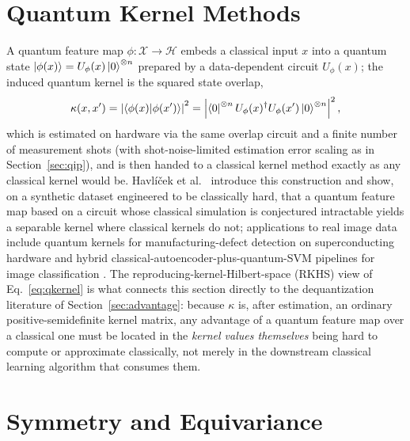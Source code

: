\documentclass[11pt]{article}
\begin{document}
\section{Quantum Kernel Methods}
\label{sec:kernel}
A quantum feature map $\phi:\mathcal{X}\to\mathcal{H}$ embeds a classical input $x$ into a quantum state $\ket{\phi(x)} = U_\phi(x)\ket{0}^{\otimes n}$ prepared by a data-dependent circuit $U_\phi(x)$; the induced quantum kernel is the squared state overlap,
\begin{equation}
\kappa(x,x') = \left|\braket{\phi(x)}{\phi(x')}\right|^2 = \left|\bra{0}^{\otimes n} U_\phi(x)^\dagger U_\phi(x') \ket{0}^{\otimes n}\right|^2,
\label{eq:qkernel}
\end{equation}
which is estimated on hardware via the same overlap circuit and a finite number of measurement shots (with shot-noise-limited estimation error scaling as in Section~\ref{sec:qip}), and is then handed to a classical kernel method exactly as any classical kernel would be. Havlíček et al.\ \cite{Havlicek2019} introduce this construction and show, on a synthetic dataset engineered to be classically hard, that a quantum feature map based on a circuit whose classical simulation is conjectured intractable yields a separable kernel where classical kernels do not; applications to real image data include quantum kernels for manufacturing-defect detection on superconducting hardware \cite{QuantumKernelDefect2022} and hybrid classical-autoencoder-plus-quantum-SVM pipelines for image classification \cite{Slabbert2024}. The reproducing-kernel-Hilbert-space (RKHS) view of Eq.~\eqref{eq:qkernel} is what connects this section directly to the dequantization literature of Section~\ref{sec:advantage}: because $\kappa$ is, after estimation, an ordinary positive-semidefinite kernel matrix, any advantage of a quantum feature map over a classical one must be located in the \emph{kernel values themselves} being hard to compute or approximate classically, not merely in the downstream classical learning algorithm that consumes them.

\section{Symmetry and Equivariance}
\label{sec:symmetry}
\end{document}
